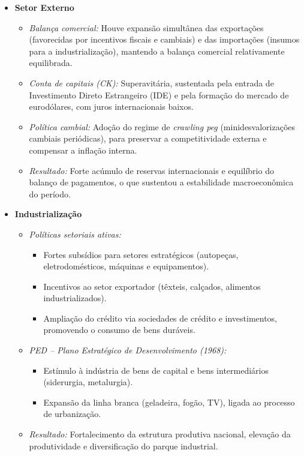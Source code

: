 \documentclass{sciposter}
\begin{document}
\begin{multicols}{3}
\begin{itemize}
    \item \textbf{ Setor Externo}
    \begin{itemize}
        \item \textit{Balança comercial:} Houve expansão simultânea das exportações (favorecidas por incentivos fiscais e cambiais) e das importações (insumos para a industrialização), mantendo a balança comercial relativamente equilibrada.
        \item \textit{Conta de capitais (CK):} Superavitária, sustentada pela entrada de Investimento Direto Estrangeiro (IDE) e pela formação do mercado de eurodólares, com juros internacionais baixos.
        \item \textit{Política cambial:} Adoção do regime de \textit{crawling peg} (minidesvalorizações cambiais periódicas), para preservar a competitividade externa e compensar a inflação interna.
        \item \textit{Resultado:} Forte acúmulo de reservas internacionais e equilíbrio do balanço de pagamentos, o que sustentou a estabilidade macroeconômica do período.
    \end{itemize}

    \item \textbf{ Industrialização}
    \begin{itemize}
        \item \textit{Políticas setoriais ativas:}
        \begin{itemize}
            \item Fortes subsídios para setores estratégicos (autopeças, eletrodomésticos, máquinas e equipamentos).
            \item Incentivos ao setor exportador (têxteis, calçados, alimentos industrializados).
            \item Ampliação do crédito via sociedades de crédito e investimentos, promovendo o consumo de bens duráveis.
        \end{itemize}
        \item \textit{PED – Plano Estratégico de Desenvolvimento (1968):}
        \begin{itemize}
            \item Estímulo à indústria de bens de capital e bens intermediários (siderurgia, metalurgia).
            \item Expansão da linha branca (geladeira, fogão, TV), ligada ao processo de urbanização.
        \end{itemize}
        \item \textit{Resultado:} Fortalecimento da estrutura produtiva nacional, elevação da produtividade e diversificação do parque industrial.
    \end{itemize}
\end{itemize}


\end{multicols}
\end{document}
